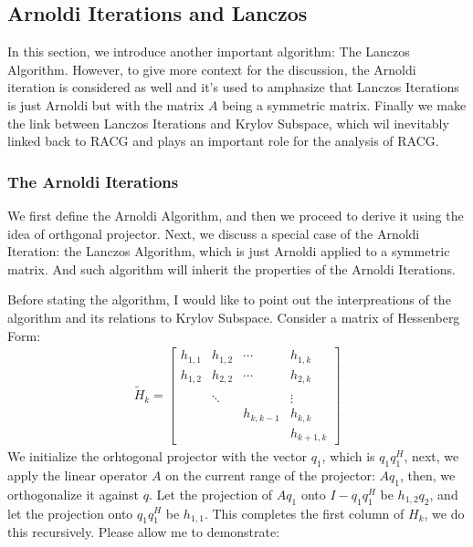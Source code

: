 \documentclass[]{article}
\theoremstyle{definition}
\begin{document}
    \subsection{Arnoldi Iterations and Lanczos}
        In this section, we introduce another important algorithm: The Lanczos Algorithm. However, to give more context for the discussion, the Arnoldi iteration is considered as well and it's used to amphasize that Lanczos Iterations is just Arnoldi but with the matrix $A$ being a symmetric matrix. Finally we make the link between Lanczos Iterations and Krylov Subspace, which wil inevitably linked back to RACG and plays an important role for the analysis of RACG. 
        \subsubsection{The Arnoldi Iterations}
            We first define the Arnoldi Algorithm, and then we proceed to derive it using the idea of orthgonal projector. Next, we discuss a special case of the Arnoldi Iteration: the Lanczos Algorithm, which is just Arnoldi applied to a symmetric matrix. And such algorithm will inherit the properties of the Arnoldi Iterations. 
            \par
            Before stating the algorithm, I would like to point out the interpreations of the algorithm and its relations to Krylov Subspace. Consider a matrix of Hessenberg Form:
            \begin{align}
                \tilde{H}_k = 
                \begin{bmatrix}
                    h_{1, 1} & h_{1, 2} & \cdots & h_{1, k} 
                    \\
                    h_{1, 2} & h_{2, 2} & \cdots & h_{2, k}
                    \\
                    \\
                    & \ddots & &\vdots
                    \\
                    & & h_{k, k - 1}& h_{k, k}
                    \\
                    & & & h_{k + 1, k}
                \end{bmatrix}
            \end{align}
            We initialize the orhtogonal projector with the vector $q_1$, which is $q_1q_1^H$, next, we apply the linear operator $A$ on the current range of the projector: $Aq_1$, then, we orthogonalize it against $q$. Let the projection of $Aq_1$ onto $I - q_1q_1^H$ be $h_{1, 2}q_2$, and let the projection onto $q_1q_1^H$ be $h_{1,1}$. This completes the first column of $H_k$, we do this recursively. Please allow me to demonstrate: 
\end{document}
